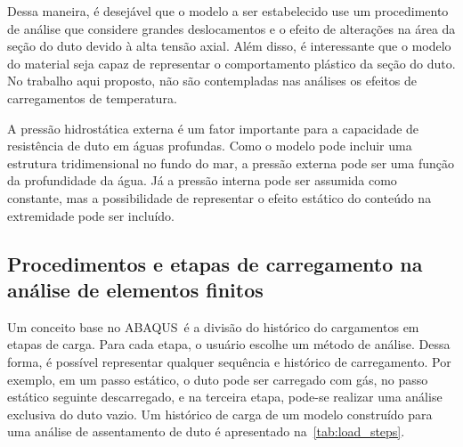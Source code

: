 Dessa maneira, é desejável que o modelo a ser estabelecido use um procedimento de análise que considere grandes deslocamentos e o efeito de alterações na área da seção do duto devido à alta tensão axial.
Além disso, é interessante que o modelo do material seja capaz de representar o comportamento plástico da seção do duto. No trabalho aqui proposto, não são contempladas nas análises os efeitos de carregamentos de temperatura.

A pressão hidrostática externa é um fator importante para a capacidade de resistência de duto em águas profundas.
Como o modelo pode incluir uma estrutura tridimensional no fundo do mar, a pressão externa pode ser uma função da profundidade da água.
Já a pressão interna pode ser assumida como constante, mas a possibilidade de representar o efeito estático do conteúdo na extremidade pode ser incluído.


\subsection{Procedimentos e etapas de carregamento na análise de elementos finitos}


Um conceito base no ABAQUS~é a divisão do histórico do cargamentos em etapas de carga. Para cada etapa, o usuário escolhe um método de análise.
Dessa forma, é possível representar qualquer sequência  e histórico de carregamento.
Por exemplo, em um passo estático, o duto pode ser carregado com gás, no passo estático seguinte descarregado, e na terceira etapa, pode-se realizar uma análise exclusiva do duto vazio.
Um histórico de carga de um modelo construído para uma análise de assentamento de duto é apresentado na~\autoref{tab:load_steps}.


